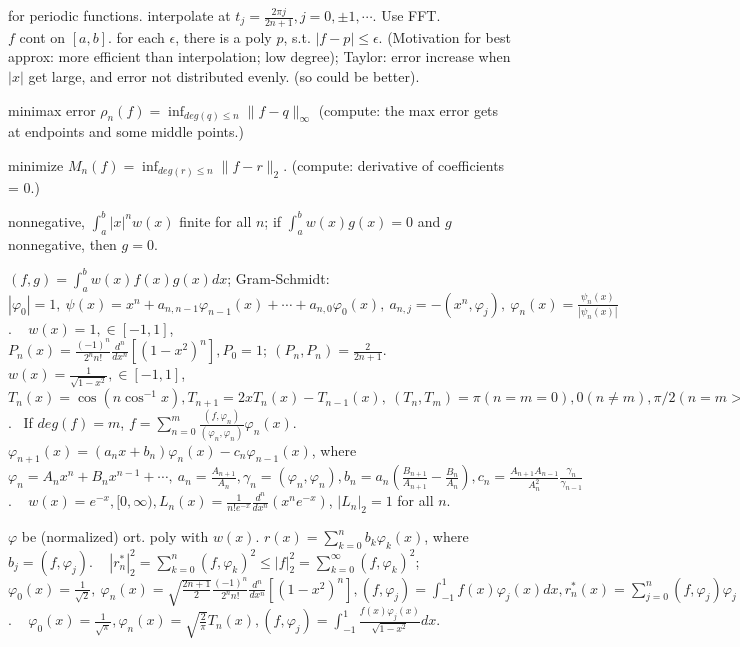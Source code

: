  for periodic functions. interpolate at $t_{j} = \frac{2\pi j}{2n+1}, j = 0, \pm 1,\cdots$. Use FFT. \\[5pt]

 $f$ cont on $[a, b]$. for each $\epsilon$, there is a poly $p$, s.t. $|f-p|\le\epsilon$. (Motivation for best approx: more efficient than interpolation; low degree); Taylor: error increase when $|x|$ get large, and error not distributed evenly. (so could be better).

 minimax error $\rho_n(f) = \inf_{deg(q)\le n}\lVert f-q\rVert_{\infty} $ (compute: the max error gets at endpoints and some middle points.)

 minimize $M_n(f) = \inf_{deg(r)\le n}\lVert f-r\rVert_2 $. (compute: derivative of coefficients = 0.)

 nonnegative, $\int_{a}^{b}|x|^nw(x) $ finite for all $n$; if $\int_{a}^{b}w(x)g(x) = 0 $ and $g$ nonnegative, then $g = 0$.

 $(f, g) = \int_{a}^{b}w(x)f(x)g(x)dx $; Gram-Schmidt: $|\varphi_0| = 1, ~\psi(x) = x^n+a_{n,n-1}\varphi_{n-1}(x)+\cdots+a_{n, 0}\varphi_0(x), ~a_{n, j} = -(x^n, \varphi_j), ~\varphi_n(x) = \frac{\psi_n(x)}{|\psi_n(x)|} $. ~ $w(x) = 1, \in[-1, 1]$, $P_n(x) = \frac{(-1)^n}{2^nn!}\frac{d^n}{dx^n}[(1-x^2)^n], P_0 = 1; ~(P_n, P_n) = \frac{2}{2n+1} $. ~ $w(x) = \frac{1}{\sqrt{1-x^2}}, \in[-1, 1]$, $T_n(x) = \cos(n\cos^{-1}x), T_{n+1} = 2xT_n(x)-T_{n-1}(x), ~(T_n, T_m) = \pi(n=m=0), 0(n\ne m), \pi/2(n=m>0) $. ~If $deg(f) = m$, $f = \sum_{n=0}^{m}\frac{(f,\varphi_n)}{(\varphi_n, \varphi_n)}\varphi_n(x) $. ~ $\varphi_{n+1}(x) = (a_nx+b_n)\varphi_n(x)-c_n\varphi_{n-1}(x) $, where $\varphi_n = A_nx^n+B_nx^{n-1}+\cdots, ~a_n = \frac{A_{n+1}}{A_n}, \gamma_n = (\varphi_n, \varphi_n), b_n = a_n(\frac{B_{n+1}}{A_{n+1}}-\frac{B_n}{A_n}), c_n = \frac{A_{n+1}A_{n-1}}{A_n^2}\frac{\gamma_n}{\gamma_{n-1}}$. ~ $w(x) = e^{-x}, [0, \infty), L_n(x) = \frac{1}{n!e^{-x}}\frac{d^n}{dx^n}(x^ne^{-x}) $, $|L_n|_2 = 1 $ for all $n$.

 $\varphi$ be (normalized) ort. poly with $w(x)$. $r(x) = \sum_{k=0}^{n}b_k\varphi_k(x) $, where $b_j = (f, \varphi_j) $. ~ $|r_n^*|_2^2 = \sum_{k=0}^{n}(f, \varphi_k)^2 \le |f|_2^2 = \sum_{k=0}^{\infty}(f, \varphi_k)^2 $; ~ $\varphi_0(x) = \frac{1}{\sqrt{2}}, ~\varphi_n(x) = \sqrt{\frac{2n+1}{2}}\frac{(-1)^n}{2^nn!}\frac{d^n}{dx^n}[(1-x^2)^n], (f, \varphi_j) = \int_{-1}^1f(x)\varphi_j(x)dx, r_n^*(x) = \sum_{j=0}^{n}(f, \varphi_j)\varphi_j(x) $. ~ $\varphi_0(x) = \frac{1}{\sqrt{\pi}}, \varphi_n(x) = \sqrt{\frac{2}{\pi}}T_n(x), (f, \varphi_j) = \int_{-1}^1\frac{f(x)\varphi_j(x)}{\sqrt{1-x^2}}dx $.

